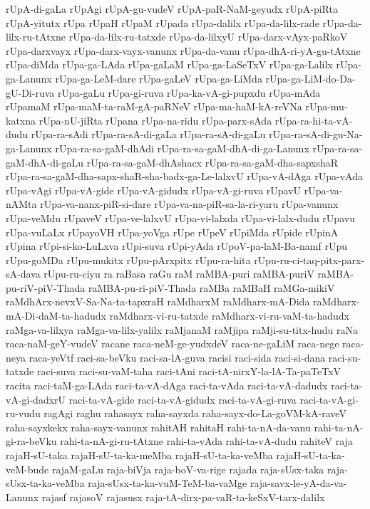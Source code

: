 {rUpA-di-gaLa
rUpAgi
rUpA-gu-vudeV
rUpA-paR-NaM-geyudx
rUpA-piRta
rUpA-yitutx
rUpa
rUpaH
rUpaM
rUpada
rUpa-dalilx
rUpa-da-lilx-rade
rUpa-da-lilx-ru-tAtxne
rUpa-da-lilx-ru-tatxde
rUpa-da-lilxyU
rUpa-darx-vAyx-paRkoV
rUpa-darxvayx
rUpa-darx-vayx-vanunx
rUpa-da-vanu
rUpa-dhA-ri-yA-gu-tAtxne
rUpa-diMda
rUpa-ga-LAda
rUpa-gaLaM
rUpa-ga-LaSeTxV
rUpa-ga-Lalilx
rUpa-ga-Lanunx
rUpa-ga-LeM-dare
rUpa-gaLeV
rUpa-ga-LiMda
rUpa-ga-LiM-do-Da-gU-Di-ruva
rUpa-gaLu
rUpa-gi-ruva
rUpa-ka-vA-gi-pupxdu
rUpa-mAda
rUpamaM
rUpa-maM-ta-raM-gA-paRNeV
rUpa-ma-haM-kA-reVNa
rUpa-mu-katxna
rUpa-nU-jiRta
rUpana
rUpa-na-ridu
rUpa-parx-sAda
rUpa-ra-hi-ta-vA-dudu
rUpa-ra-sAdi
rUpa-ra-sA-di-gaLa
rUpa-ra-sA-di-gaLu
rUpa-ra-sA-di-gu-Na-ga-Lanunx
rUpa-ra-sa-gaM-dhAdi
rUpa-ra-sa-gaM-dhA-di-ga-Lanunx
rUpa-ra-sa-gaM-dhA-di-gaLu
rUpa-ra-sa-gaM-dhAshacx
rUpa-ra-sa-gaM-dha-sapxshaR
rUpa-ra-sa-gaM-dha-sapx-shaR-sha-badx-ga-Le-lalxvU
rUpa-vA-dAga
rUpa-vAda
rUpa-vAgi
rUpa-vA-gide
rUpa-vA-gidudx
rUpa-vA-gi-ruva
rUpavU
rUpa-va-nAMta
rUpa-va-nanx-piR-si-dare
rUpa-va-na-piR-sa-la-ri-yaru
rUpa-vanunx
rUpa-veMdu
rUpaveV
rUpa-ve-lalxvU
rUpa-vi-lalxda
rUpa-vi-lalx-dudu
rUpavu
rUpa-vuLaLx
rUpayoVH
rUpa-yoVga
rUpe
rUpeV
rUpiMda
rUpide
rUpinA
rUpina
rUpi-si-ko-LuLxva
rUpi-suva
rUpi-yAda
rUpoV-pa-laM-Ba-namf
rUpu
rUpu-goMDa
rUpu-mukitx
rUpu-pArxpitx
rUpu-ra-hita
rUpu-ru-ci-taq-pitx-parx-sA-dava
rUpu-ru-ciyu
ra
raBasa
raGu
raM
raMBA-puri
raMBA-puriV
raMBA-pu-riV-piV-Thada
raMBA-pu-ri-piV-Thada
raMBa
raMBaH
raMGa-mikiV
raMdhArx-nevxV-Sa-Na-ta-tapxraH
raMdharxM
raMdharx-mA-Dida
raMdharx-mA-Di-daM-ta-hadudx
raMdharx-vi-ru-tatxde
raMdharx-vi-ru-vaM-ta-hadudx
raMga-va-lilxya
raMga-va-lilx-yalilx
raMjanaM
raMjipa
raMji-su-titx-hudu
raNa
raca-naM-geY-vudeV
racane
raca-neM-ge-yudxdeV
raca-ne-gaLiM
raca-nege
raca-neya
raca-yeVtf
raci-sa-beVku
raci-sa-lA-guva
racisi
raci-sida
raci-si-dana
raci-su-tatxde
raci-suva
raci-su-vaM-taha
raci-tAni
raci-tA-nirxY-la-lA-Ta-paTeTxV
racita
raci-taM-ga-LAda
raci-ta-vA-dAga
raci-ta-vAda
raci-ta-vA-dadudx
raci-ta-vA-gi-dadxrU
raci-ta-vA-gide
raci-ta-vA-gidudx
raci-ta-vA-gi-ruva
raci-ta-vA-gi-ru-vudu
ragAgi
raghu
rahasayx
raha-sayxda
raha-sayx-do-La-goVM-kA-raveV
raha-sayxkekx
raha-sayx-vanunx
rahitAH
rahitaH
rahi-ta-nA-da-vanu
rahi-ta-nA-gi-ra-beVku
rahi-ta-nA-gi-ru-tAtxne
rahi-ta-vAda
rahi-ta-vA-dudu
rahiteV
raja
rajaH-sU-taka
rajaH-sU-ta-ka-meMba
rajaH-sU-ta-ka-veMba
rajaH-sU-ta-ka-veM-bude
rajaM-gaLu
raja-biVja
raja-boV-va-rige
rajada
raja-sUsx-taka
raja-sUsx-ta-ka-veMba
raja-sUsx-ta-ka-vuM-TeM-ba-vaMge
raja-savx-le-yA-da-va-Lanunx
rajasf
rajasoV
rajasusx
raja-tA-dirx-pa-vaR-ta-keSxV-tarx-dalilx
}
